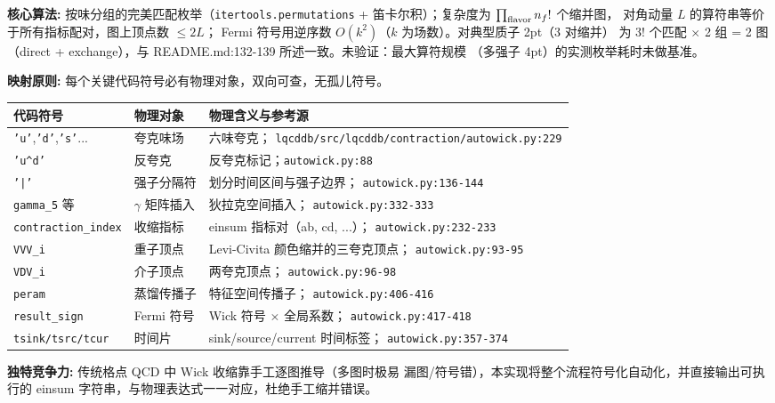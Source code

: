 \documentclass[UTF8]{ctexart}
\begin{document}
\begin{algobox}
\textbf{核心算法:} 按味分组的完美匹配枚举（\texttt{itertools.permutations}
+ 笛卡尔积）；复杂度为 $\prod_{\rm flavor} n_f!$ 个缩并图，
对角动量 $L$ 的算符串等价于所有指标配对，图上顶点数 $\le 2L$；
Fermi 符号用逆序数 $O(k^2)$（$k$ 为场数）。对典型质子 2pt（3 对缩并）
为 3! 个匹配 $\times$ 2 组 = 2 图（direct + exchange），与
README.md:132-139 所述一致。\textcolor{warn}{未验证}：最大算符规模
（多强子 4pt）的实测枚举耗时未做基准。
\end{algobox}

\begin{mapbox}
\textbf{映射原则:} 每个关键代码符号必有物理对象，双向可查，无孤儿符号。
\end{mapbox}

\begin{xltabular}{\textwidth}{llX}
\toprule
\textcolor{map}{代码符号} & 物理对象 & 物理含义与参考源 \\
\midrule
\endhead
\texttt{'u'},\texttt{'d'},\texttt{'s'}... & 夸克味场 & 六味夸克；
\texttt{\nolinkurl{lqcddb/src/lqcddb/contraction/autowick.py:229}} \\
\texttt{'u\^{}d'} & 反夸克 & 反夸克标记；\texttt{autowick.py:88} \\
\texttt{'|'} & 强子分隔符 & 划分时间区间与强子边界；
\texttt{\nolinkurl{autowick.py:136-144}} \\
\texttt{gamma\_5} 等 & $\gamma$ 矩阵插入 & 狄拉克空间插入；
\texttt{\nolinkurl{autowick.py:332-333}} \\
\texttt{contraction\_index} & 收缩指标 & einsum 指标对（ab, cd, ...）；
\texttt{\nolinkurl{autowick.py:232-233}} \\
\texttt{VVV\_i} & 重子顶点 & Levi-Civita 颜色缩并的三夸克顶点；
\texttt{\nolinkurl{autowick.py:93-95}} \\
\texttt{VDV\_i} & 介子顶点 & 两夸克顶点；
\texttt{\nolinkurl{autowick.py:96-98}} \\
\texttt{peram} & 蒸馏传播子 & 特征空间传播子；
\texttt{\nolinkurl{autowick.py:406-416}} \\
\texttt{result\_sign} & Fermi 符号 & Wick 符号 $\times$ 全局系数；
\texttt{\nolinkurl{autowick.py:417-418}} \\
\texttt{tsink/tsrc/tcur} & 时间片 & sink/source/current 时间标签；
\texttt{\nolinkurl{autowick.py:357-374}} \\
\bottomrule
\end{xltabular}

\textbf{独特竞争力:} 传统格点 QCD 中 Wick 收缩靠手工逐图推导（多图时极易
漏图/符号错），本实现将整个流程符号化自动化，并直接输出可执行的
einsum 字符串，与物理表达式一一对应，杜绝手工缩并错误。
\end{document}
